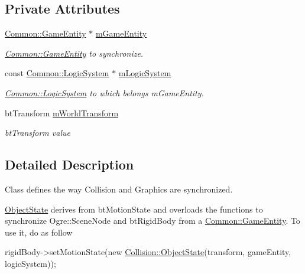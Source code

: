 \subsection*{Private Attributes}
\begin{DoxyCompactItemize}
\item 
\mbox{\label{class_collision_1_1_object_state_ad0917d300eec0439ee54009b09abd9a1}} 
\hyperlink{struct_common_1_1_game_entity}{Common\+::\+Game\+Entity} $\ast$ \hyperlink{class_collision_1_1_object_state_ad0917d300eec0439ee54009b09abd9a1}{m\+Game\+Entity}
\begin{DoxyCompactList}\small\item\em \hyperlink{struct_common_1_1_game_entity}{Common\+::\+Game\+Entity} to synchronize. \end{DoxyCompactList}\item 
\mbox{\label{class_collision_1_1_object_state_a3704d8a82f457b4c67a102188db4d950}} 
const \hyperlink{class_common_1_1_logic_system}{Common\+::\+Logic\+System} $\ast$ \hyperlink{class_collision_1_1_object_state_a3704d8a82f457b4c67a102188db4d950}{m\+Logic\+System}
\begin{DoxyCompactList}\small\item\em \hyperlink{class_common_1_1_logic_system}{Common\+::\+Logic\+System} to which belongs m\+Game\+Entity. \end{DoxyCompactList}\item 
\mbox{\label{class_collision_1_1_object_state_aa1e96983ea35069a8801ee6aa0e76a24}} 
bt\+Transform \hyperlink{class_collision_1_1_object_state_aa1e96983ea35069a8801ee6aa0e76a24}{m\+World\+Transform}
\begin{DoxyCompactList}\small\item\em bt\+Transform value \end{DoxyCompactList}\end{DoxyCompactItemize}


\subsection{Detailed Description}
Class defines the way Collision and Graphics are synchronized. 

\hyperlink{class_collision_1_1_object_state}{Object\+State} derives from bt\+Motion\+State and overloads the functions to synchronize Ogre\+::\+Scene\+Node and bt\+Rigid\+Body from a \hyperlink{struct_common_1_1_game_entity}{Common\+::\+Game\+Entity}. To use it, do as follow 
\begin{DoxyCode}
rigidBody->setMotionState(\textcolor{keyword}{new} \hyperlink{class_collision_1_1_object_state}{Collision::ObjectState}(transform, gameEntity, 
      logicSystem));
\end{DoxyCode}
 

